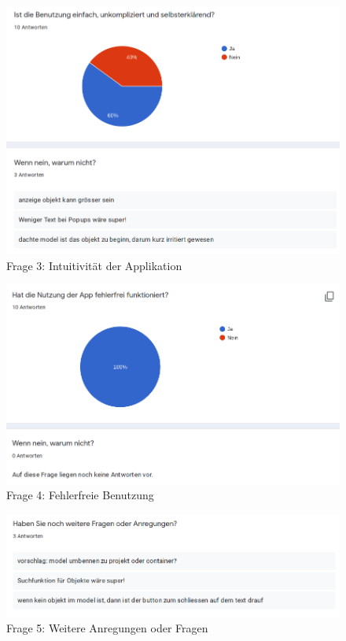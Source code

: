 \documentclass[oneside]{ausarbeitung}
\begin{document}
\begin{figure}[hptb]
	\centering
	\includegraphics[height=0.5\textheight]{images/umfrage-selbsterklaerend.png}
	\caption{Frage 3: Intuitivität der Applikation}
	\label{fig:beta:selbsterklaerend}
\end{figure}

\begin{figure}[hptb]
	\centering
	\includegraphics[height=0.4\textheight]{images/umfrage-fehlerfrei-funktioniert.png}
	\caption{Frage 4: Fehlerfreie Benutzung}
	\label{fig:beta:nobugs}
\end{figure}

\begin{figure}[hptb]
	\centering
	\includegraphics[height=0.25\textheight]{images/umfrage-further-questions.png}
	\caption{Frage 5: Weitere Anregungen oder Fragen}
	\label{fig:beta:further}
\end{figure}
\end{document}

